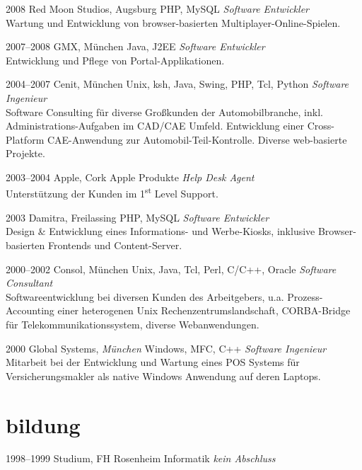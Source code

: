 \documentclass[]{friggeri-cv-a4}
\begin{document}
\begin{entrylist}
\entry
{2008}
{Red Moon Studios, Augsburg}
{PHP, MySQL}
{\emph{Software Entwickler} \\
Wartung und Entwicklung von browser-basierten Multiplayer-Online-Spielen.}
\end{entrylist}


\begin{entrylist}
\entry
{2007--2008}
{GMX, München}
{Java, J2EE}
{\emph{Software Entwickler} \\
Entwicklung und Pflege von Portal-Applikationen.}
\end{entrylist}


\begin{entrylist}
\entry
{2004--2007}
{Cenit, München}
{Unix, ksh, Java, Swing, PHP, Tcl, Python}
{\emph{Software Ingenieur} \\
Software Consulting für diverse Großkunden der Automobilbranche, inkl. Administrations-Aufgaben im CAD/CAE Umfeld. Entwicklung einer Cross-Platform CAE-Anwendung zur Automobil-Teil-Kontrolle. Diverse web-basierte Projekte.}
\end{entrylist}


\begin{entrylist}
\entry
{2003--2004}
{Apple, Cork}
{Apple Produkte}
{\emph{Help Desk Agent} \\
Unterstützung der Kunden im 1\textsuperscript{st} Level Support.}
\end{entrylist}

\begin{entrylist}
\entry
{2003}
{Damitra, Freilassing}
{PHP, MySQL}
{\emph{Software Entwickler} \\
Design \& Entwicklung eines Informations- und Werbe-Kiosks, inklusive Browser-basierten Frontends und Content-Server.}
\end{entrylist}

\begin{entrylist}
\entry
{2000--2002}
{Consol, München}
{Unix, Java, Tcl, Perl, C/C++, Oracle}
{\emph{Software Consultant} \\
Softwareentwicklung bei diversen Kunden des Arbeitgebers, u.a. Prozess-Accounting einer heterogenen Unix Rechenzentrumslandschaft, CORBA-Bridge für Telekommunikationssystem, diverse Webanwendungen.}
\end{entrylist}

\begin{entrylist}
\entry
{2000}
{Global Systems, \emph{München}}
{Windows, MFC, C++}
{\emph{Software Ingenieur} \\
Mitarbeit bei der Entwicklung und Wartung eines POS Systems für Versicherungsmakler als native Windows Anwendung auf deren Laptops.}
\end{entrylist}

\section{bildung}
\begin{entrylist}
\entry
{1998--1999}
{Studium, FH Rosenheim}
{Informatik}
{\textit{kein Abschluss}}
\end{entrylist}
\end{document}

